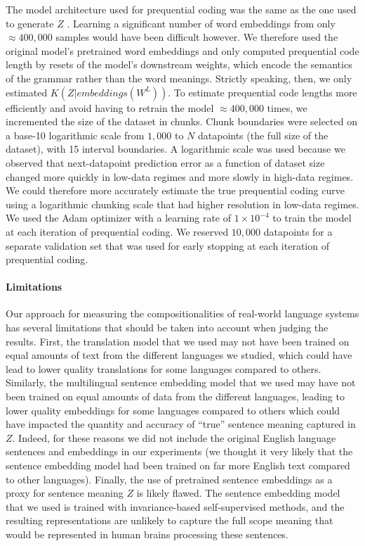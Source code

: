 \documentclass{article} %
\begin{document}
\begin{appendices}
The model architecture used for prequential coding was the same as the one used to generate $Z$ \citep{reimers-2020-multilingual-sentence-bert}. Learning a significant number of word embeddings from only $\approx 400,000$ samples would have been difficult however. We therefore used the original model's pretrained word embeddings and only computed prequential code length by resets of the model's downstream weights, which encode the semantics of the grammar rather than the word meanings. Strictly speaking, then, we only estimated $K(Z|embeddings(W^L))$. To estimate prequential code lengths more efficiently and avoid having to retrain the model $\approx 400,000$ times, we incremented the size of the dataset in chunks. Chunk boundaries were selected on a base-10 logarithmic scale from $1,000$ to $N$ datapoints (the full size of the dataset), with 15 interval boundaries. A logarithmic scale was used because we observed that next-datapoint prediction error as a function of dataset size changed more quickly in low-data regimes and more slowly in high-data regimes. We could therefore more accurately estimate the true prequential coding curve using a logarithmic chunking scale that had higher resolution in low-data regimes. We used the Adam optimizer with a learning rate of $1 \times 10^{-4}$ to train the model at each iteration of prequential coding. We reserved $10,000$ datapoints for a separate validation set that was used for early stopping at each iteration of prequential coding.

\paragraph{Limitations}

Our approach for measuring the compositionalities of real-world language systems has several limitations that should be taken into account when judging the results. First, the translation model that we used may not have been trained on equal amounts of text from the different languages we studied, which could have lead to lower quality translations for some languages compared to others. Similarly, the multilingual sentence embedding model that we used may have not been trained on equal amounts of data from the different languages, leading to lower quality embeddings for some languages compared to others which could have impacted the quantity and accuracy of ``true'' sentence meaning captured in $Z$. Indeed, for these reasons we did not include the original English language sentences and embeddings in our experiments (we thought it very likely that the sentence embedding model had been trained on far more English text compared to other languages). Finally, the use of pretrained sentence embeddings as a proxy for sentence meaning $Z$ is likely flawed. The sentence embedding model that we used is trained with invariance-based self-supervised methods, and the resulting representations are unlikely to capture the full scope meaning that would be represented in human brains processing these sentences.


\end{appendices}
\end{document}
